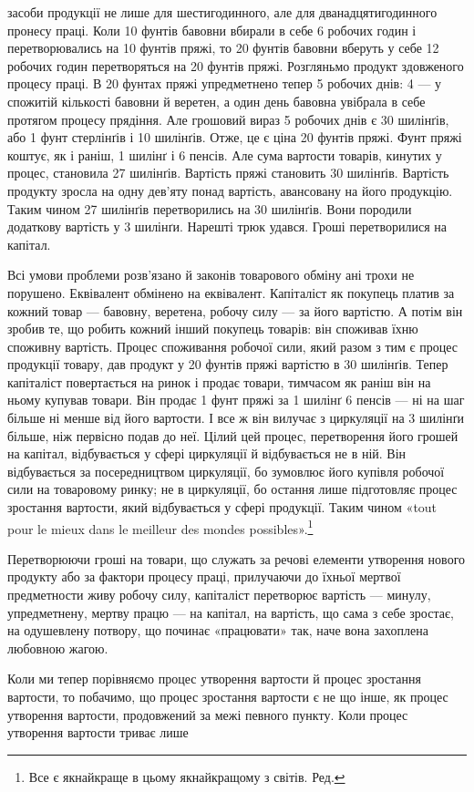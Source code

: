 засоби продукції не лише для шестигодинного, але для дванадцятигодинного
пронесу праці. Коли 10 фунтів бавовни вбирали
в себе 6 робочих годин і перетворювались на 10 фунтів пряжі, то
20 фунтів бавовни вберуть у себе 12 робочих годин  перетворяться
на 20 фунтів пряжі. Розгляньмо продукт здовженого процесу
праці. В 20 фунтах пряжі упредметнено тепер 5 робочих днів:
4 — у спожитій кількості бавовни й веретен, а один день бавовна
увібрала в себе протягом процесу прядіння. Але грошовий вираз
5 робочих днів є 30 шилінґів, або 1 фунт стерлінґів і 10 шилінґів.
Отже, це є ціна 20 фунтів пряжі. Фунт пряжі коштує, як і
раніш, 1 шилінґ і 6 пенсів. Але сума вартости товарів, кинутих у
процес, становила 27 шилінґів. Вартість пряжі становить 30 шилінґів.
Вартість продукту зросла на одну дев’яту понад вартість,
авансовану на його продукцію. Таким чином 27 шилінґів перетворились
на 30 шилінґів. Вони породили додаткову вартість
у 3 шилінґи. Нарешті трюк удався. Гроші перетворилися
на капітал.

Всі умови проблеми розв’язано й законів товарового обміну
ані трохи не порушено. Еквівалент обмінено на еквівалент.
Капіталіст як покупець платив за кожний товар — бавовну,
веретена, робочу силу — за його вартістю. А потім він зробив
те, що робить кожний інший покупець товарів: він споживав
їхню споживну вартість. Процес споживання робочої сили, який
разом з тим є процес продукції товару, дав продукт у 20 фунтів
пряжі вартістю в 30 шилінґів. Тепер капіталіст повертається
на ринок і продає товари, тимчасом як раніш він на ньому
купував товари. Він продає 1 фунт пряжі за 1 шилінґ 6 пенсів —
ні на шаг більше ні менше від його вартости. І все ж він вилучає
з циркуляції на 3 шилінґи більше, ніж первісно подав до неї.
Цілий цей процес, перетворення його грошей на капітал, відбувається
у сфері циркуляції й відбувається не в ній. Він відбувається
за посередництвом циркуляції, бо зумовлює його купівля
робочої сили на товаровому ринку; не в циркуляції, бо остання
лише підготовляє процес зростання вартости, який відбувається
у сфері продукції. Таким чином «tout pour le mieux dans le meilleur
des mondes possibles».\footnote*{
Все є якнайкраще в цьому якнайкращому з світів. Ред.
}

Перетворюючи гроші на товари, що служать за речові
елементи утворення нового продукту або за фактори процесу
праці, прилучаючи до їхньої мертвої предметности живу робочу
силу, капіталіст перетворює вартість — минулу, упредметнену,
мертву працю — на капітал, на вартість, що сама з себе зростає,
на одушевлену потвору, що починає «працювати» так, наче вона
захоплена любовною жагою.

Коли ми тепер порівняємо процес утворення вартости й процес
зростання вартости, то побачимо, що процес зростання вартости є
не що інше, як процес утворення вартости, продовжений за межі
певного пункту. Коли процес утворення вартости триває лише